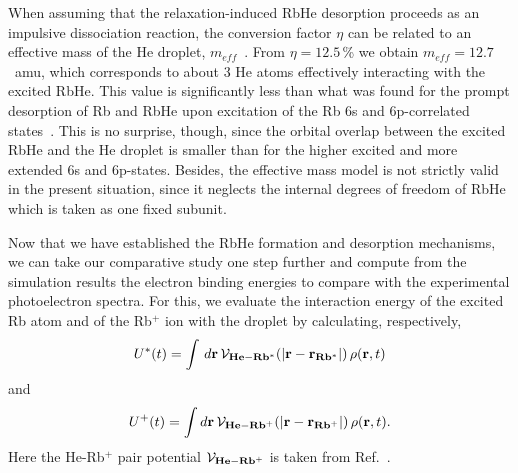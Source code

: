 When assuming that the relaxation-induced RbHe desorption proceeds as an impulsive dissociation reaction, the conversion factor $\eta$ can be related to an effective mass of the He droplet, $m_{eff}$~\cite{Hernando:2012}. From $\eta = 12.5\,$\% we obtain $m_{eff}=12.7$~amu, which corresponds to about 3 He atoms effectively interacting with the excited RbHe. This value is significantly less than what was found for the prompt desorption of Rb and RbHe upon excitation of the Rb 6s and 6p-correlated states~\cite{Fechner:2012,Vangerow:2014}. This is no surprise, though, since the orbital overlap between the excited RbHe and the He droplet is smaller than for the higher excited and more extended 6s and 6p-states. Besides, the effective mass model is not strictly valid in the present situation, since it neglects the internal degrees of freedom of RbHe which is taken as one fixed subunit.

Now that we have established the RbHe formation and desorption mechanisms, we can take our comparative study one step further and compute from the simulation results the electron binding energies to compare with the experimental photoelectron spectra. For this, we evaluate the interaction energy of the excited Rb atom and of the Rb$^+$ ion with the droplet by calculating, respectively, 
%
\begin{equation}
U^*(t) = \int  \, d \mathbf{r} \, {\cal V}_\mathrm{\mathbf{He-Rb^*}} (|\mathbf{r} -  \mathbf{r}_\mathrm{\mathbf{Rb^*}}|) \, \rho(\mathbf{r},t)
\label{eq77}
\end{equation}
%
and  
%
\begin{equation}
U^+(t) = \int  d \mathbf{r}  \, {\cal V}_\mathrm{\mathbf{He-Rb^+}} (|\mathbf{r} -  \mathbf{r}_\mathrm{\mathbf{Rb^+}}|) \, \rho(\mathbf{r},t)
\label{eq779}.
\end{equation}
%
Here the He-Rb$^+$ pair potential ${\cal V}_\mathrm{\mathbf{He-Rb^+}}$ is taken from  Ref.~\cite{Leal:2014}. 

